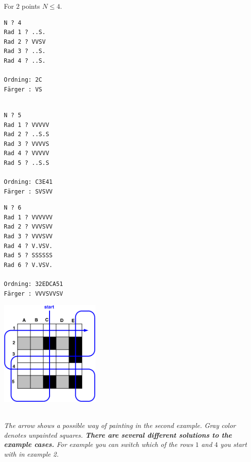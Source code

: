  For $2$ points $N \le 4$.
\setlength\columnsep{20pt}
\begin{multicols}{3}

\begin{verbatim}
N ? 4
Rad 1 ? ..S.
Rad 2 ? VVSV
Rad 3 ? ..S.
Rad 4 ? ..S.

Ordning: 2C
Färger : VS


\end{verbatim}
\vfill
\columnbreak

\begin{verbatim}
N ? 5
Rad 1 ? VVVVV
Rad 2 ? ..S.S
Rad 3 ? VVVVS
Rad 4 ? VVVVV
Rad 5 ? ..S.S

Ordning: C3E41
Färger : SVSVV

\end{verbatim}
\vfill
\columnbreak

\begin{verbatim}
N ? 6
Rad 1 ? VVVVVV
Rad 2 ? VVVSVV
Rad 3 ? VVVSVV
Rad 4 ? V.VSV.
Rad 5 ? SSSSSS
Rad 6 ? V.VSV.

Ordning: 32EDCA51
Färger : VVVSVVSV
\end{verbatim}

\vfill
\end{multicols}
\begin{multicols}{2}
\begin{center}
  \includegraphics[width=5cm]{../skolkval/dentrottemalaren/problem_statement/golv.pdf}
\end{center}
\columnbreak
~\\ 
    \emph{The arrow shows a possible way of painting in the second example. Gray color denotes unpainted squares. \textbf{There are several different solutions to the example cases.}
    For example you can switch which of the rows $1$ and $4$ you start with in example 2.
    }
\vfill
\end{multicols}

